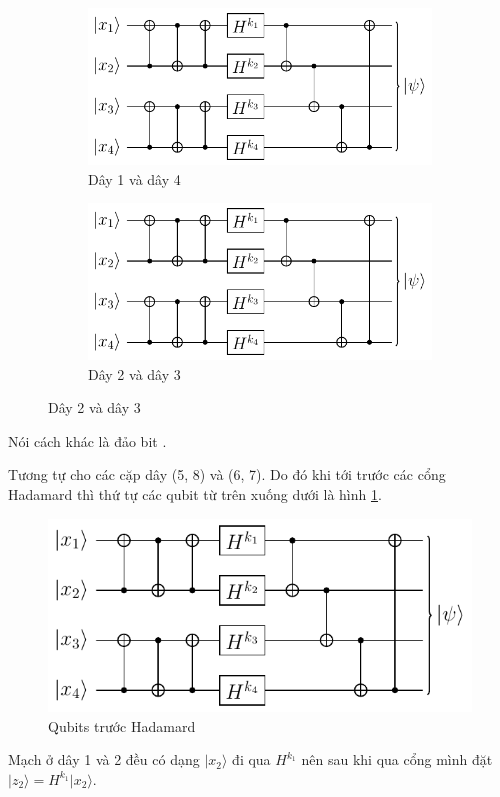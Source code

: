 \begin{figure}[ht]
    \centering
    \begin{subfigure}{0.3\textwidth}
        \includegraphics[page=4]{nsucrypto/2023/problem10_figures.pdf}
        \caption{Dây 1 và dây 4}
    \end{subfigure}
    \begin{subfigure}{0.3\textwidth}
        \includegraphics[page=5]{nsucrypto/2023/problem10_figures.pdf}
        \caption{Dây 2 và dây 3}
    \end{subfigure}
\end{figure}

Nói cách khác là đảo bit .

Tương tự cho các cặp dây (5, 8) và (6, 7). Do đó khi tới trước các cổng Hadamard thì thứ tự các qubit từ trên xuống dưới là hình \ref{nsucrypto23:p10_4}.

\begin{figure}[ht]
    \centering
    \includegraphics[page=6]{nsucrypto/2023/problem10_figures.pdf}
    \caption{Qubits trước Hadamard}
    \label{nsucrypto23:p10_4}
\end{figure}
Mạch ở dây 1 và 2 đều có dạng $\lvert x_2 \rangle$ đi qua $H^{k_1}$ nên sau khi qua cổng mình đặt $\lvert z_2 \rangle = H^{k_1} \lvert x_2 \rangle$.

